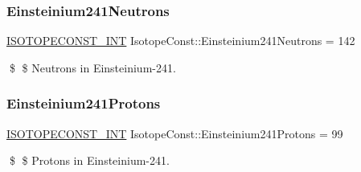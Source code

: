 \subsubsection{\texorpdfstring{Einsteinium241\+Neutrons}{Einsteinium241Neutrons}}
{\footnotesize\ttfamily \mbox{\hyperlink{group___isotope_const-_macros_ga5f18360b3e99483a35c32d789e62621c}{I\+S\+O\+T\+O\+P\+E\+C\+O\+N\+S\+T\+\_\+\+I\+NT}} Isotope\+Const\+::\+Einsteinium241\+Neutrons = 142}

\$ \$ Neutrons in Einsteinium-\/241. \mbox{\label{group___isotope_const-_einsteinium-_es241_gaf6e15aed103b89e62cdc5af366b537e9}} 
\subsubsection{\texorpdfstring{Einsteinium241\+Protons}{Einsteinium241Protons}}
{\footnotesize\ttfamily \mbox{\hyperlink{group___isotope_const-_macros_ga5f18360b3e99483a35c32d789e62621c}{I\+S\+O\+T\+O\+P\+E\+C\+O\+N\+S\+T\+\_\+\+I\+NT}} Isotope\+Const\+::\+Einsteinium241\+Protons = 99}

\$ \$ Protons in Einsteinium-\/241. 